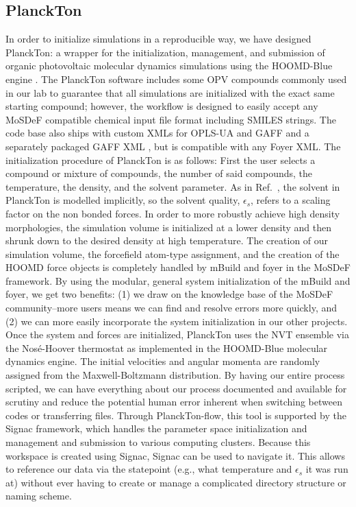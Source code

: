 \subsection{PlanckTon}
In order to initialize simulations in a reproducible way, we have designed PlanckTon: a wrapper for the initialization, management, and submission of organic photovoltaic molecular dynamics simulations using the HOOMD-Blue engine \citep{planckton, Jankowski2019, Anderson2020}.
The PlanckTon software includes some OPV compounds commonly used in our lab to guarantee that all simulations are initialized with the exact same starting compound; however, the workflow is designed to easily accept any MoSDeF compatible chemical input file format including SMILES strings. 
The code base also ships with custom XMLs for OPLS-UA and GAFF and a separately packaged GAFF XML \citep{DeFever}, but is compatible with any Foyer XML. 
The initialization procedure of PlanckTon is as follows: First the user selects a compound or mixture of compounds, the number of said compounds, the temperature, the density, and the solvent parameter. 
As in Ref.~\citet{Miller2018}, the solvent in PlanckTon is modelled implicitly, so the solvent quality, $\epsilon_{s}$, refers to a scaling factor on the non bonded forces.
In order to more robustly achieve high density morphologies, the simulation volume is initialized at a lower density and then shrunk down to the desired density at high temperature\cite{Jankowski2013,Marsh2014,Jones2017,Henry2017a,Miller2018}. 
The creation of our simulation volume, the forcefield atom-type assignment, and the creation of the HOOMD force objects is completely handled by mBuild and foyer in the MoSDeF framework\citep{mbuild,foyer}.
By using the modular, general system initialization of the mBuild and foyer, we get two benefits: (1) we draw on the knowledge base of the MoSDeF community--more users means we can find and resolve errors more quickly, and (2) we can more easily incorporate the system initialization in our other projects. 
Once the system and forces are initialized, PlanckTon uses the NVT ensemble via the Nosé-Hoover thermostat \citep{Martyna1994d, Martyna1996} as implemented in the HOOMD-Blue molecular dynamics engine. 
The initial velocities and angular momenta are randomly assigned from the Maxwell-Boltzmann distribution.
By having our entire process scripted, we can have everything about our process documented and available for scrutiny and reduce the potential human error inherent when switching between codes or transferring files.
Through PlanckTon-flow, this tool is supported by the Signac framework, which handles the parameter space initialization and management and submission to various computing clusters. Because this workspace is created using Signac, Signac can be used to navigate it. This allows to reference our data via the statepoint (e.g., what temperature and $\epsilon_{s}$ it was run at) without ever having to create or manage a complicated directory structure or naming scheme.

